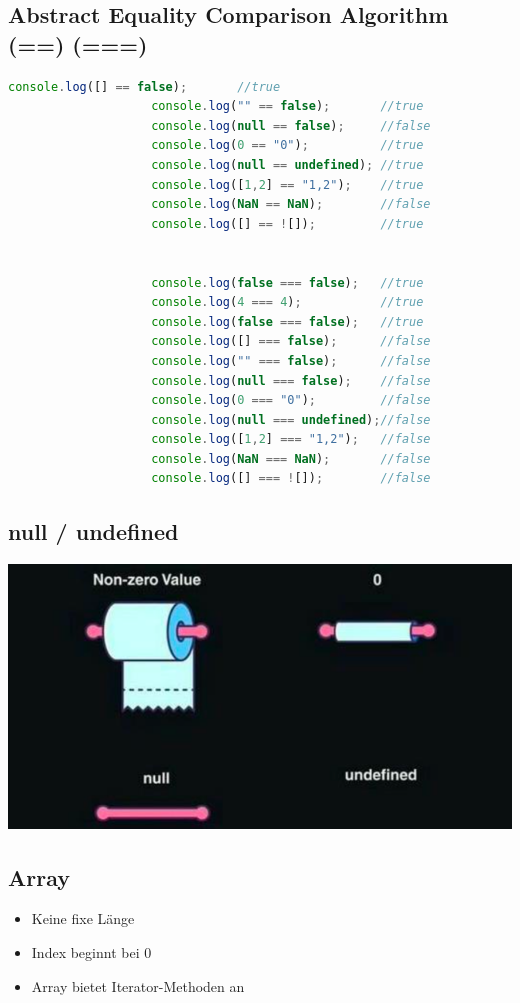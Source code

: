 \documentclass[a4paper, landscape, 8pt]{scrartcl}
\begin{document}
\begin{multicols*}{4}
        \subsection{Abstract Equality Comparison Algorithm (==) (===)}
        \begin{lstlisting}[language=JavaScript]
                    console.log([] == false);       //true
                    console.log("" == false);       //true
                    console.log(null == false);     //false
                    console.log(0 == "0");          //true
                    console.log(null == undefined); //true
                    console.log([1,2] == "1,2");    //true
                    console.log(NaN == NaN);        //false
                    console.log([] == ![]);         //true


                    console.log(false === false);   //true
                    console.log(4 === 4);           //true
                    console.log(false === false);   //true
                    console.log([] === false);      //false
                    console.log("" === false);      //false
                    console.log(null === false);    //false
                    console.log(0 === "0");         //false
                    console.log(null === undefined);//false
                    console.log([1,2] === "1,2");   //false
                    console.log(NaN === NaN);       //false
                    console.log([] === ![]);        //false
        \end{lstlisting}

        \subsection{null / undefined}
        \includegraphics[scale=0.2]{graphic/35-toilet-roll-example}

        \subsection{Array}
        \begin{itemize}
            \item Keine fixe Länge
            \item Index beginnt bei 0
            \item Array bietet Iterator-Methoden an
        \end{itemize}
        

\end{multicols*}
\end{document}
